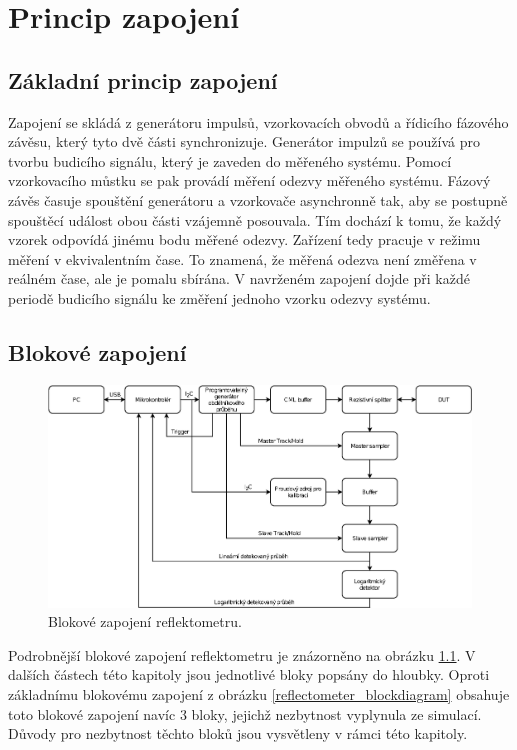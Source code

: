 \chapter{Princip zapojení}

\section{Základní princip zapojení}
Zapojení se skládá z generátoru impulsů, vzorkovacích obvodů a řídicího fázového závěsu, který tyto dvě části synchronizuje. Generátor impulzů se používá pro tvorbu budicího signálu, který je zaveden do měřeného systému. Pomocí vzorkovacího můstku se pak provádí měření odezvy měřeného systému. Fázový závěs časuje spouštění generátoru a vzorkovače asynchronně tak, aby se postupně spouštěcí událost obou části vzájemně posouvala. Tím dochází k tomu, že každý vzorek odpovídá jinému bodu měřené odezvy. Zařízení tedy pracuje v režimu měření v ekvivalentním čase. To znamená, že měřená odezva není změřena v reálném čase, ale je pomalu sbírána. V navrženém zapojení dojde při každé periodě budicího signálu ke změření jednoho vzorku odezvy systému.

\section{Blokové zapojení}
\begin{figure}[htbp]
\includegraphics[width=\textwidth,keepaspectratio]{images/block_diagram.eps}\caption{Blokové zapojení reflektometru.} \label{block_diagram}
\end{figure}

Podrobnější blokové zapojení reflektometru je znázorněno na obrázku \ref{block_diagram}. V dalších částech této kapitoly jsou jednotlivé bloky popsány do hloubky. Oproti základnímu blokovému zapojení z obrázku \ref{reflectometer_blockdiagram} obsahuje toto blokové zapojení navíc 3 bloky, jejichž nezbytnost vyplynula ze simulací. Důvody pro nezbytnost těchto bloků jsou vysvětleny v rámci této kapitoly. 

